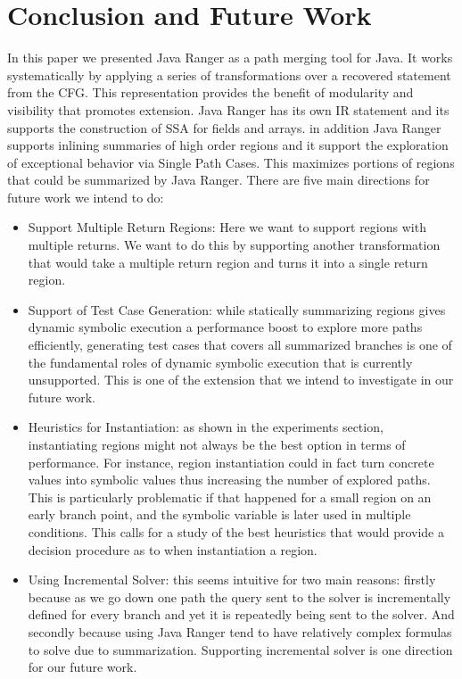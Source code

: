 \section{Conclusion and Future Work}
\label{sec:future}

In this paper we presented Java Ranger as a path merging tool for Java. 
%
It works systematically by applying a series of transformations over a recovered statement from the CFG. This representation provides the benefit of modularity and visibility that promotes extension. 
%
Java Ranger has its own IR statement and its supports the construction of SSA for fields and arrays.
%
in addition Java Ranger supports inlining summaries of high order regions and it support the exploration of exceptional behavior via Single Path Cases. 
%
This maximizes portions of regions that could be summarized by Java Ranger. 
%
There are five main directions for future work we intend to do:
\begin{itemize}
\item Support Multiple Return Regions:  Here we want to support regions with multiple returns. 
%
We want to do this by supporting another transformation that would take a multiple return region and turns it into a single return region. 

\item Support of Test Case Generation: while statically summarizing regions gives dynamic symbolic execution a performance boost to explore more paths efficiently, generating test cases that covers all summarized branches is one of the fundamental roles of dynamic symbolic execution that is currently unsupported. 
%
This is one of the extension that we intend to investigate in our future work. 
%

\item Heuristics for Instantiation: as shown in the experiments section, instantiating regions might not always be the best option in terms of performance.
%
For instance, region instantiation could in fact turn concrete values into symbolic values thus increasing the number of explored paths. 
%
This is particularly problematic if that happened for a small region on an early branch point, and the symbolic variable is later used in multiple conditions.
%
This calls for a study of the best heuristics that would provide a decision procedure as to when instantiation a region.

\item Using Incremental Solver: this seems intuitive for two main reasons: firstly because as we go down one path the query sent to the solver is incrementally defined for every branch and yet it is repeatedly being sent to the solver. 
%
And secondly because using Java Ranger tend to have relatively complex formulas to solve due to summarization. 
%
Supporting incremental solver is one direction for our future work. 
%
\end{itemize}



